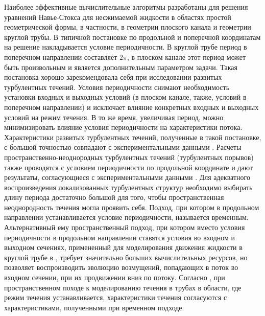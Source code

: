 Наиболее эффективные вычислительные алгоритмы разработаны для решения уравнений Навье-Стокса для несжимаемой жидкости в областях простой геометрической формы, в частности, в геометрии плоского канала и геометрии круглой трубы. В типичной постановке по продольной и поперечной координатам на решение накладывается условие периодичности. В круглой трубе период в поперечном направлении составляет $2\pi$, в плоском канале этот период может быть произвольным и является дополнительным параметром задачи. Такая постановка хорошо зарекомендовала себя при исследовании развитых турбулентных течений. Условия периодичности снимают необходимость установки входных и выходных условий (в плоском канале, также, условий в поперечном направлении) и исключает влияние конкретных входных и выходных условий на режим течения. В то же время, увеличивая период, можно минимизировать влияние условия периодичности на характеристики потока. Характеристики развитых турбулентных течений, полученные в такой постановке, с большой точностью совпадают с экспериментальными данными \cite{Kim1987, Eggels1994, Nikitin1996}. Расчеты пространственно-неоднородных турбулентных течений (турбулентных порывов) также проводятся с условием периодичности по продольной координате и дают результаты, согласующиеся с экспериментальными данными \cite{Priymak2004, Avila2010, Song2017}. Для адекватного воспроизведения локализованных турбулентных структур необходимо выбирать длину периода достаточно большой для того, чтобы пространственная неоднородность течения могла проявить себя. Подход, при котором в продольном направлении устанавливается условие периодичности, называется временным. Альтернативный ему пространственный подход, при котором вместо условия периодичности в продольном направлении ставятся условия во входном и выходном сечениях, примененный для моделирования движения жидкости в круглой трубе в \cite{Nikitin1995}, требует значительно больших вычислительных ресурсов, но позволяет воспроизводить эволюцию возмущений, попадающих в поток во входном сечении, при их продвижении вниз по потоку. Согласно \cite{Nikitin1995}, при пространственном походе к моделированию течения в трубах в области, где режим течения устанавливается, характеристики течения согласуются с характеристиками, полученными при временном подходе. 

